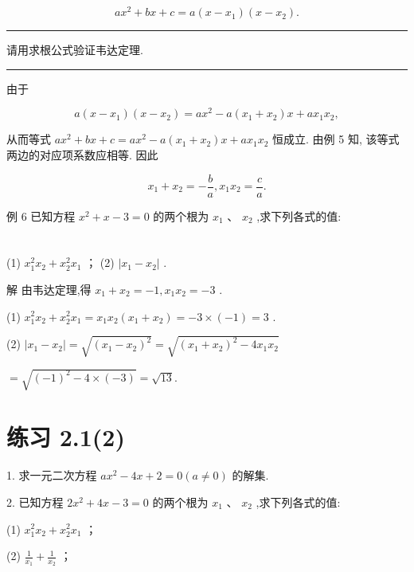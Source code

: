 \documentclass[10pt]{article}
\newcommand{\HRule}{\begin{center}\rule{0.9\linewidth}{0.2mm}\end{center}}
\begin{document}
\[
a{x}^{2} + {bx} + c = a\left( {x - {x}_{1}}\right) \left( {x - {x}_{2}}\right) .
\]

\HRule

请用求根公式验证韦达定理.

\HRule

由于

\[
a\left( {x - {x}_{1}}\right) \left( {x - {x}_{2}}\right)  = a{x}^{2} - a\left( {{x}_{1} + {x}_{2}}\right) x + a{x}_{1}{x}_{2},
\]

从而等式 \(a{x}^{2} + {bx} + c = a{x}^{2} - a\left( {{x}_{1} + {x}_{2}}\right) x + a{x}_{1}{x}_{2}\) 恒成立. 由例 5 知, 该等式两边的对应项系数应相等. 因此

\[
{x}_{1} + {x}_{2} =  - \frac{b}{a},{x}_{1}{x}_{2} = \frac{c}{a}.
\]

例 6 已知方程 \({x}^{2} + x - 3 = 0\) 的两个根为 \({x}_{1}\text{ 、 }{x}_{2}\) ,求下列各式的值:



\section*{}

(1) \({x}_{1}^{2}{x}_{2} + {x}_{2}^{2}{x}_{1}\) ； (2) \(\left| {{x}_{1} - {x}_{2}}\right|\) .

解 由韦达定理,得 \({x}_{1} + {x}_{2} =  - 1,{x}_{1}{x}_{2} =  - 3\) .

(1) \({x}_{1}^{2}{x}_{2} + {x}_{2}^{2}{x}_{1} = {x}_{1}{x}_{2}\left( {{x}_{1} + {x}_{2}}\right)  =  - 3 \times  \left( {-1}\right)  = 3\) .

(2) \(\left| {{x}_{1} - {x}_{2}}\right|  = \sqrt{{\left( {x}_{1} - {x}_{2}\right) }^{2}} = \sqrt{{\left( {x}_{1} + {x}_{2}\right) }^{2} - 4{x}_{1}{x}_{2}}\)

\(= \sqrt{{\left( -1\right) }^{2} - 4 \times  \left( {-3}\right) } = \sqrt{13}.\)

\section*{练习 2.1(2)}

1. 求一元二次方程 \(a{x}^{2} - {4x} + 2 = 0\left( {a \neq  0}\right)\) 的解集.

2. 已知方程 \(2{x}^{2} + {4x} - 3 = 0\) 的两个根为 \({x}_{1}\text{ 、 }{x}_{2}\) ,求下列各式的值:

(1) \({x}_{1}^{2}{x}_{2} + {x}_{2}^{2}{x}_{1}\) ；

(2) \(\frac{1}{{x}_{1}} + \frac{1}{{x}_{2}}\) ；
\end{document}
